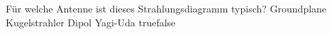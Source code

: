     {Für welche Antenne ist dieses Strahlungsdiagramm typisch?}
    {Groundplane}
    {Kugelstrahler}
    {Dipol}
    {Yagi-Uda}
    {true}{false}